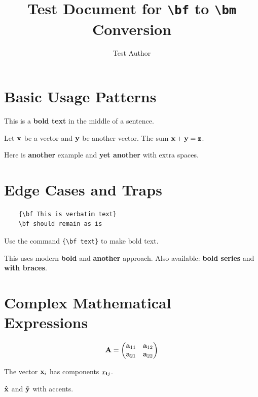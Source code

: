 \documentclass{article}
\title{Test Document for \texttt{\textbackslash bf} to \texttt{\textbackslash bm} Conversion}
\author{Test Author}
\begin{document}
\maketitle

\section{Basic Usage Patterns}

This is a {\bf bold text} in the middle of a sentence.

Let ${\bf x}$ be a vector and ${\bf y}$ be another vector.
The sum ${\bf x} + {\bf y} = {\bf z}$.

Here is {\bf another} example and {\bf  yet another  } with extra spaces.

\section{Edge Cases and Traps}


\begin{verbatim}
	{\bf This is verbatim text}
	\bf should remain as is
\end{verbatim}

Use the command \verb|{\bf text}| to make bold text.

This uses modern \textbf{bold} and \textbf{another} approach.
Also available: {\bfseries bold series} and \textbf{with braces}.

\section{Complex Mathematical Expressions}

$$
{\bf A} = \begin{pmatrix}
	{\bf a}_{11} & {\bf a}_{12} \\
	{\bf a}_{21} & {\bf a}_{22}
\end{pmatrix}
$$

The vector ${\bf x}_i$ has components $x_{{\bf i}j}$.

${\bf \hat{x}}$ and ${\bf \tilde{y}}$ with accents.
\end{document}
